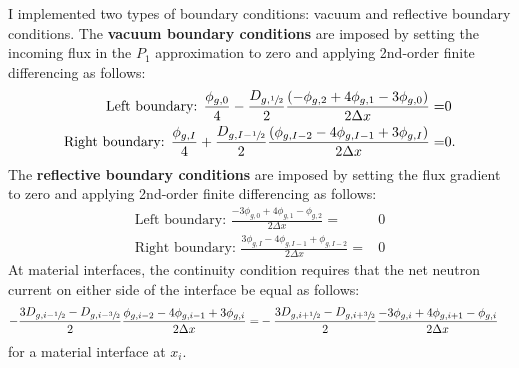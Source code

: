 I implemented two types of boundary conditions: vacuum and reflective boundary conditions. The
\textbf{vacuum boundary conditions} are imposed by setting the incoming flux in the $P_1$
approximation to zero and applying 2nd-order finite differencing as follows:
%
\begin{align}
  \mbox{Left boundary: } \frac{\phi_{g,0}}{4}-\frac{D_{g,\sfrac{1}{2}}}{2}
  \frac{\left(-\phi_{g,2}+4\phi_{g,1}-3\phi_{g,0}\right)}{2\Delta x} =& 0 \\
  \mbox{Right boundary: } \frac{\phi_{g,I}}{4}+\frac{D_{g,I-\sfrac{1}{2}}}{2}
  \frac{\left(\phi_{g,I-2}-4\phi_{g,I-1}+3\phi_{g,I}\right)}{2\Delta x} =& 0.
\end{align}
%
The \textbf{reflective boundary conditions} are imposed by setting the flux gradient to zero and
applying 2nd-order finite differencing as follows:
%
\begin{align}
  \mbox{Left boundary: } \frac{-3\phi_{g,0}+4\phi_{g,1}-\phi_{g,2}}{2\Delta x} =& 0 \\
  \mbox{Right boundary: } \frac{3\phi_{g,I}-4\phi_{g,I-1}+\phi_{g,I-2}}{2\Delta x} =& 0
\end{align}
%
At material interfaces, the continuity condition requires that the net neutron current on either
side of the interface be equal as follows:
%
\begin{align}
  -\frac{3D_{g,i-\sfrac{1}{2}} - D_{g,i-\sfrac{3}{2}} }{2}
  \frac{\phi_{g,i-2}-4\phi_{g,i-1}+3\phi_{g,i}}{2\Delta x} =&
  -\frac{3D_{g,i+\sfrac{1}{2}} - D_{g,i+\sfrac{3}{2}} }{2}
  \frac{-3\phi_{g,i}+4\phi_{g,i+1}-\phi_{g,i}}{2\Delta x} \label{eq:itf-bc}
\end{align}
%
for a material interface at $x_i$.

